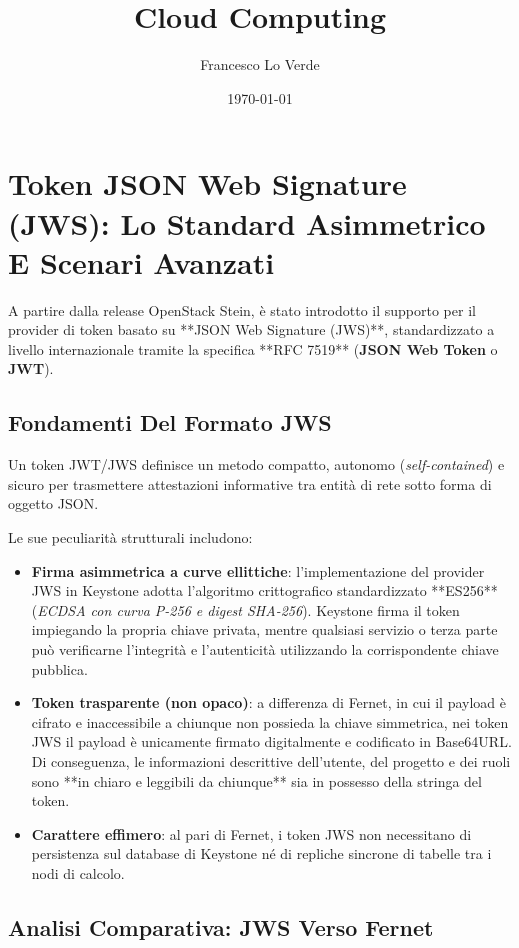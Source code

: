 \documentclass[11pt, a4paper]{article}
\title{Cloud Computing}
\date{\today}
\author{Francesco Lo Verde}
\begin{document}
\section{Token JSON Web Signature (JWS): Lo Standard Asimmetrico E Scenari Avanzati}

A partire dalla release OpenStack Stein, è stato introdotto il supporto per il provider di token basato su **JSON Web Signature (JWS)**, standardizzato a livello internazionale tramite la specifica **RFC 7519** (\textbf{JSON Web Token} o \textbf{JWT}).

\subsection{Fondamenti Del Formato JWS}

Un token JWT/JWS definisce un metodo compatto, autonomo (\emph{self-contained}) e sicuro per trasmettere attestazioni informative tra entità di rete sotto forma di oggetto JSON.

Le sue peculiarità strutturali includono:
\begin{itemize}[noitemsep]
    \item \textbf{Firma asimmetrica a curve ellittiche}: l'implementazione del provider JWS in Keystone adotta l'algoritmo crittografico standardizzato **ES256** (\emph{ECDSA con curva P-256 e digest SHA-256}). Keystone firma il token impiegando la propria chiave privata, mentre qualsiasi servizio o terza parte può verificarne l'integrità e l'autenticità utilizzando la corrispondente chiave pubblica.
    \item \textbf{Token trasparente (non opaco)}: a differenza di Fernet, in cui il payload è cifrato e inaccessibile a chiunque non possieda la chiave simmetrica, nei token JWS il payload è unicamente firmato digitalmente e codificato in Base64URL. Di conseguenza, le informazioni descrittive dell'utente, del progetto e dei ruoli sono **in chiaro e leggibili da chiunque** sia in possesso della stringa del token.
    \item \textbf{Carattere effimero}: al pari di Fernet, i token JWS non necessitano di persistenza sul database di Keystone né di repliche sincrone di tabelle tra i nodi di calcolo.
\end{itemize}

\subsection{Analisi Comparativa: JWS Verso Fernet}
\end{document}

